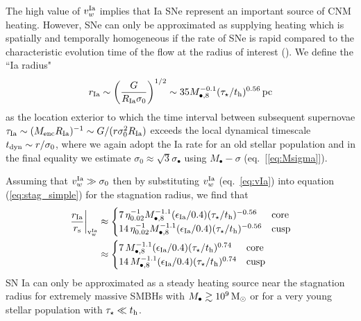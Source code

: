\documentclass[usenatbib,fleqn]{mn2e}
\begin{document}
The high value of $v_{w}^{\rm Ia}$ implies that Ia SNe represent an
important source of CNM heating.  However, SNe can only be
approximated as supplying heating which is spatially and temporally
homogeneous if the rate of SNe is rapid compared to the characteristic
evolution time of the flow at the radius of interest
(\citealt{ShcherbakovWong+:2014a}).  We define the ``Ia radius"
  \begin{align}
    r_{\rm Ia} \sim \left(\frac{G}{R_{\rm Ia}\sigma_0}\right)^{1/2} \sim
    35 M_{\bullet,8}^{-0.1}(\tau_{\star}/t_{\rm h})^{0.56}\,{\rm pc}
    \label{eq:rIa}
  \end{align}
  as the location exterior to which the time interval between
  subsequent supernovae $\tau_{\rm Ia} \sim (M_{\rm enc}R_{\rm
    Ia})^{-1} \sim G/(r\sigma_0^{2}R_{\rm Ia})$ exceeds the local
  dynamical timescale $t_{\rm dyn} \sim r/\sigma_0$, where we again
  adopt the Ia rate for an old stellar population and in the final
  equality we estimate $\sigma_0 \approx \sqrt{3}\sigma_{\bullet}$
  using $M_{\bullet}-\sigma$ (eq.~[\ref{eq:Msigma}]).

Assuming that $v_{w}^{\rm Ia} \gg \sigma_0$ then by substituting
$v_{w}^{\rm Ia}$ (eq.~\ref{eq:vIa}) into equation (\ref{eq:stag_simple})
for the stagnation radius, we find that
\begin{align}
  \left.\frac{r_{\rm Ia}}{r_{\rm s}}\right|_{\rm v_{w}^{\rm Ia}}&\approx
  \begin{cases}
    7\, \eta_{0.02}^{-1} M_{\bullet,8}^{-1.1}(\epsilon_{\rm
     Ia}/0.4) (\tau_{\star}/t_{\rm h})^{-0.56}  & {\rm core}\\
    14\, \eta_{0.02}^{-1} M_{\bullet,8}^{-1.1}(\epsilon_{\rm
     Ia}/0.4) (\tau_{\star}/t_{\rm h})^{-0.56} &{\rm cusp}\\
   \end{cases} \nonumber\\
 &\approx 
 \begin{cases}
    7\, M_{\bullet,8}^{-1.1}(\epsilon_{\rm
     Ia}/0.4) (\tau_{\star}/t_{\rm h})^{0.74}  & {\rm core}\\
    14\, M_{\bullet,8}^{-1.1}(\epsilon_{\rm
     Ia}/0.4) (\tau_{\star}/t_{\rm h})^{0.74} &{\rm cusp}\\
   \end{cases}
\label{eq:rIars}
\end{align}
SN Ia can only be approximated as a steady heating source near the stagnation radius for extremely
massive SMBHs with $M_{\bullet} \gtrsim 10^9 \,{\rm M_\odot}$ or for a very
young stellar population with $\tau_{\star} \ll t_{\rm h}$.
\end{document}
